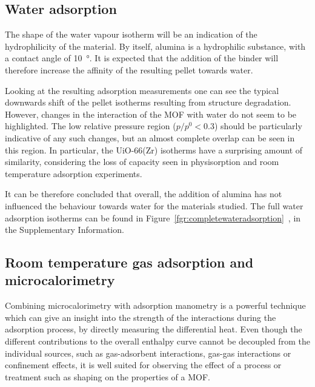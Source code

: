 \subsection{Water adsorption}

The shape of the water vapour isotherm will be an indication of the hydrophilicity
of the material. By itself, alumina is a hydrophilic substance, with a contact 
angle of \SI{10}{\degree}. It is expected that the addition of the binder will
therefore increase the affinity of the resulting pellet towards water.

Looking at the resulting adsorption measurements one can see the typical downwards
shift of the pellet isotherms resulting from structure degradation. However, changes
in the interaction of the MOF with water do not seem to be highlighted. The low relative
pressure region (\(p/p^0 < 0.3\)) should be particularly indicative of any such 
changes, but an almost complete overlap can be seen in this region.
In particular, the UiO-66(Zr) isotherms have a surprising amount of similarity,
considering the loss of capacity seen in  physisorption and room temperature 
adsorption experiments.

It can be therefore concluded that overall, the addition of alumina has not influenced 
the behaviour towards water for the materials studied. The full water adsorption isotherms
can be found in Figure~\ref*{fgr:completewateradsorption}~, in the Supplementary Information.

\subsection{Room temperature gas adsorption and microcalorimetry}

Combining microcalorimetry with adsorption manometry is a powerful technique which can
give an insight into the strength of the interactions during the adsorption process,
by directly measuring the differential heat. Even though the different contributions 
to the overall enthalpy curve cannot be decoupled from the individual sources, 
such as gas-adsorbent interactions, gas-gas interactions or confinement effects, it 
is well suited for observing the effect of a process or treatment such as shaping
on the properties of a MOF.

